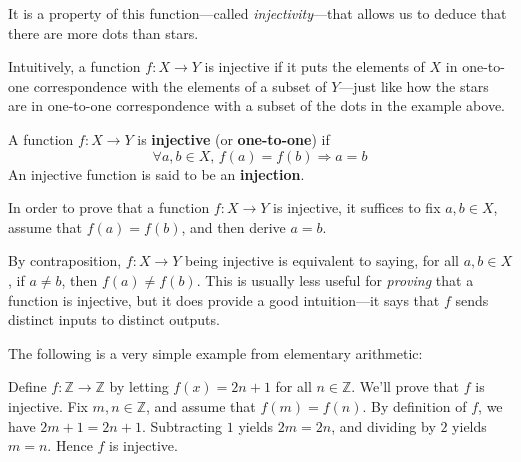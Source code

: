 \begin{center}
\end{center}

It is a property of this function---called \textit{injectivity}---that allows us to deduce that there are more dots than stars.

Intuitively, a function $f : X \to Y$ is injective if it puts the elements of $X$ in one-to-one correspondence with the elements of a subset of $Y$---just like how the stars are in one-to-one correspondence with a subset of the dots in the example above.

\begin{definition}
\label{defInjective}\label{defInjection}
A function $f : X \to Y$ is \textbf{injective} (or \textbf{one-to-one}) if
\[ \forall a,b \in X,\, f(a) = f(b) \Rightarrow a=b \]
An injective function is said to be an \textbf{injection}.
\end{definition}

\begin{strategy}
In order to prove that a function $f : X \to Y$ is injective, it suffices to fix $a,b \in X$, assume that $f(a)=f(b)$, and then derive $a=b$.
\end{strategy}

By contraposition, $f : X \to Y$ being injective is equivalent to saying, for all $a,b \in X$, if $a \ne b$, then $f(a) \ne f(b)$. This is usually less useful for \textit{proving} that a function is injective, but it does provide a good intuition---it says that $f$ sends distinct inputs to distinct outputs.

The following is a very simple example from elementary arithmetic:
\begin{example}
Define $f : \mathbb{Z} \to \mathbb{Z}$ by letting $f(x) = 2n+1$ for all $n \in \mathbb{Z}$. We'll prove that $f$ is injective. Fix $m, n \in \mathbb{Z}$, and assume that $f(m)=f(n)$. By definition of $f$, we have $2m+1=2n+1$. Subtracting $1$ yields $2m=2n$, and dividing by $2$ yields $m=n$. Hence $f$ is injective.
\end{example}

